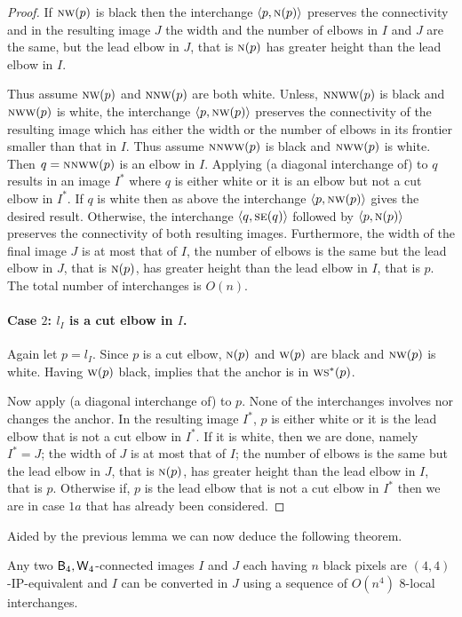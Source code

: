 \documentclass[lotsofwhite,charterfonts]{patmorin}
\newcommand{\fourfour}{\ensuremath{\protect\textup{\textsf{B}}_{4},\protect\textup{\textsf{W}}_{4}}}
\newcommand{\N}{\textsc{n}}
\newcommand{\SE}{\textsc{se}}
\renewcommand{\S}{\textsc{s}}
\newcommand{\W}{\textsc{w}}
\newcommand{\NW}{\textsc{nw}}
\newcommand{\ic}[2]{\langle #1,#2 \rangle}
\begin{document}
\begin{proof}
If $\NW(p)$ is black then the interchange $\ic{p}{\N(p)}$ preserves
the connectivity and in the resulting image $J$ the width and the
number of elbows in $I$ and $J$ are the same, but the lead elbow in
$J$, that is $\N(p)$ has greater height than the  lead elbow in $I$. 

Thus assume $\NW(p)$ and $\N\NW(p)$ are both white. Unless,
$\N\NW\W(p)$ is black and $\NW\W(p)$ is white, the interchange
$\ic{p}{\NW(p)}$ preserves the connectivity of the resulting image
which has either the width or the number of elbows in its frontier
smaller than that in $I$. Thus assume $\N\NW\W(p)$ is black and
$\NW\W(p)$ is white. Then $q=\N\NW\W(p)$ is an elbow in $I$. Applying
(a diagonal interchange of)  to $q$ results in an
image $I^*$ where $q$ is either white or it is an elbow but not a cut
elbow in $I^*$. If $q$ is white then as above the interchange
$\ic{p}{\NW(p)}$ gives the desired result. Otherwise, the interchange
$\ic{q}{\SE(q)}$ followed by $\ic{p}{\N(p)}$ preserves the
connectivity of both resulting images. Furthermore, the width of the
final image $J$ is at most that of $I$, the number of elbows is the
same but the lead elbow in $J$, that is $\N(p)$, has greater height
than the lead elbow in $I$, that is $p$. The total number of
interchanges is $O(n)$.

\paragraph{Case $2$: $l_I$ is a cut elbow in $I$.} Again let $p=l_I$.
Since $p$ is a cut elbow, $\N(p)$ and $\W(p)$ are black and $\NW(p)$
is white. Having $\W(p)$ black, implies that the anchor is in
$\W\S^*(p)$. 

Now apply (a diagonal interchange of)  to $p$. None
of the interchanges involves nor changes the anchor. In the resulting
image $I^*$, $p$ is either white or it is the lead elbow that is not a
cut elbow in $I^*$. If it is white, then we are done, namely $I^*=J$;
the width of $J$ is at most that of $I$; the number of elbows is the
same but the lead elbow in $J$, that is $\N(p)$, has greater height
than the lead elbow in $I$, that is $p$. Otherwise if, $p$ is the lead
elbow that is not a cut elbow in $I^*$ then we are in case $1a$ that
has already been considered.  \end{proof}

Aided by the previous lemma we can now deduce the following theorem.

\begin{thm}
Any two \fourfour-connected images $I$ and $J$ each having $n$ black
pixels are $(4,4)$-IP-equivalent and $I$ can be converted in $J$ using a
sequence of $O(n^4)$ 8-local interchanges.
\end{thm}
\end{document}
